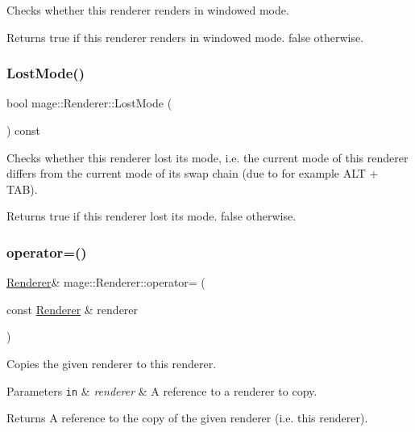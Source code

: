 Checks whether this renderer renders in windowed mode.

\begin{DoxyReturn}{Returns}
{\ttfamily true} if this renderer renders in windowed mode. {\ttfamily false} otherwise. 
\end{DoxyReturn}
\hypertarget{classmage_1_1_renderer_afdde83a1e2bc9288f000fb2575c525d0}{}\label{classmage_1_1_renderer_afdde83a1e2bc9288f000fb2575c525d0} 
\subsubsection{\texorpdfstring{Lost\+Mode()}{LostMode()}}
{\footnotesize\ttfamily bool mage\+::\+Renderer\+::\+Lost\+Mode (\begin{DoxyParamCaption}{ }\end{DoxyParamCaption}) const}

Checks whether this renderer lost its mode, i.\+e. the current mode of this renderer differs from the current mode of its swap chain (due to for example A\+LT + T\+AB).

\begin{DoxyReturn}{Returns}
{\ttfamily true} if this renderer lost its mode. {\ttfamily false} otherwise. 
\end{DoxyReturn}
\hypertarget{classmage_1_1_renderer_a2762ead5f771ae95e4293cd7eb1a2834}{}\label{classmage_1_1_renderer_a2762ead5f771ae95e4293cd7eb1a2834} 
\subsubsection{\texorpdfstring{operator=()}{operator=()}\hspace{0.1cm}{\footnotesize\ttfamily [1/2]}}
{\footnotesize\ttfamily \hyperlink{classmage_1_1_renderer}{Renderer}\& mage\+::\+Renderer\+::operator= (\begin{DoxyParamCaption}\item[{const \hyperlink{classmage_1_1_renderer}{Renderer} \&}]{renderer }\end{DoxyParamCaption})\hspace{0.3cm}{\ttfamily [delete]}}

Copies the given renderer to this renderer.


\begin{DoxyParams}[1]{Parameters}
\mbox{\tt in}  & {\em renderer} & A reference to a renderer to copy. \\
\hline
\end{DoxyParams}
\begin{DoxyReturn}{Returns}
A reference to the copy of the given renderer (i.\+e. this renderer). 
\end{DoxyReturn}
\hypertarget{classmage_1_1_renderer_aa381bb89bffdc8ea2d8e3625e28cd28a}{}\label{classmage_1_1_renderer_aa381bb89bffdc8ea2d8e3625e28cd28a} 
